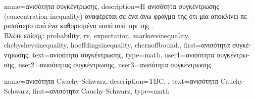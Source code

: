 {name={\foreignlanguage{greek}{ανισότητα συγκέντρωσης}}, 
	description={\foreignlanguage{greek}{Η ανισότητα συγκέντρωσης} (concentration inequality) 
		\foreignlanguage{greek}{αναφέρεται σε ένα άνω φράγμα της} 
		\foreignlanguage{greek}{ότι μία}  \foreignlanguage{greek}{αποκλίνει περισσότερο 
		από ένα καθορισμένο ποσό από την}  \foreignlanguage{greek}{της} \cite{Wain2019}.  
		\\
		\foreignlanguage{greek}{Βλέπε επίσης:} \gls{probability}, \gls{rv}, \gls{expectation}, \gls{markovsinequality}, \gls{chebyshevsinequality}, 
		\gls{hoeffdingsinequality}, \gls{chernoffbound}.}, 
	first={\foreignlanguage{greek}{ανισότητα συγκέντρωσης}}, 
	text={\foreignlanguage{greek}{ανισότητα συγκέντρωσης}},
	type=math,
	user1={\foreignlanguage{greek}{ανισότητα συγκέντρωσης}}, %
	user2={\foreignlanguage{greek}{ανισότητας συγκέντρωσης}}, %
	user3={\foreignlanguage{greek}{ανισότητα συγκέντρωσης}} %
}

{name={\foreignlanguage{greek}{ανισότητα} Cauchy-Schwarz},
	description={TBC. },
	text={\foreignlanguage{greek}{ανισότητα} Cauchy-Schwarz},
	first={\foreignlanguage{greek}{ανισότητα} Cauchy-Schwarz},
	type=math
}

